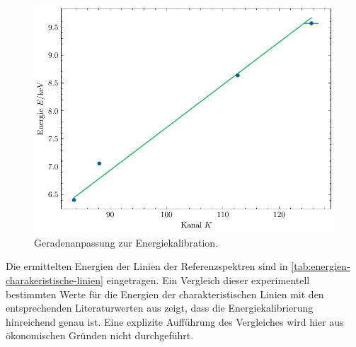 \begin{figure}[H]
	\centering
	\includegraphics[width=0.6\linewidth]{../figs/kallibrationskurve.pdf}
	\caption{Geradenanpassung zur Energiekalibration.}
	\label{fig:kalibrationskurve}
\end{figure} Die ermittelten Energien der Linien der Referenzspektren sind in \cref{tab:energien-charakeristische-linien} eingetragen. Ein Vergleich
dieser experimentell bestimmten Werte für die Energien der charakteristischen Linien mit den entsprechenden Literaturwerten aus \cite{xraydata} zeigt,
dass die Energiekalibrierung hinreichend genau ist. Eine explizite Aufführung des Vergleiches wird hier aus ökonomischen Gründen nicht durchgeführt.

\newpage

